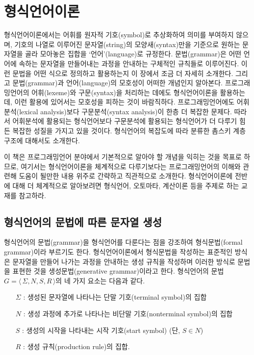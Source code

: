 \documentclass[b5paper,chapter,figtabcapt]{oblivoir}
\providecommand{\tightlist}{%
      \setlength{\itemsep}{0pt}\setlength{\parskip}{0pt}}
\begin{document}
\chapter{형식언어이론}

형식언어이론에서는 어휘를 원자적 기호(symbol)로 추상화하여 의미를 부여하지 않으며,
기호의 나열로 이루어진 문자열(string)의 모양새(syntax)만을 기준으로 원하는 문자열을
골라 모아놓은 집합을 `언어'(language)로 규정한다. 문법(grammar)은 어떤 언어에 속하는
문자열을 만들어내는 과정을 안내하는 구체적인 규칙들로 이루어진다. 이런 문법을
어떤 식으로 정의하고 활용하는지 이 장에서 조금 더 자세히 소개한다. 그리고
문법(grammar)과 언어(language)의 모호성이 어떠한 개념인지 알아본다.
프로그래밍언어의 어휘(lexeme)와 구문(syntax)을 처리하는 데에도 형식언어이론을
활용하는데, 이런 활용에 있어서는 모호성을 피하는 것이 바람직하다.
프로그래밍언어에도 어휘분석(lexical analysis)보다 구문분석(syntax analysis)이
한층 더 복잡한 문제다. 따라서 어휘분석에 활용되는 형식언어보다 구문분석에 
활용되는 형식언어가 더 다루기 힘든 복잡한 성질을 가지고 있을 것이다.
형식언어의 복잡도에 따라 분류한 촘스키 계층 구조에 대해서도 소개한다.

이 책은 프로그래밍언어 분야에서 기본적으로 알아야 할 개념을 익히는
것을 목표로 하므로, 여기서는 형식언어이론을 체계적으로 다루기보다는
프로그래밍언어의 이해와 관련해 도움이 될만한 내용 위주로 간략하고 직관적으로 소개한다. 
형식언어이론에 전반에 대해 더 체계적으로 알아보려면 형식언어, 오토마타, 계산이론
등을 주제로 하는 교재\cite{Sipser2013,Hopcroft2007}를 참고하라.

\section{형식언어의 문법에 따른 문자열 생성}
\label{sec:GenGrammar}
형식언어의 문법(grammar)을 형식언어를 다룬다는 점을 강조하여 형식문법(formal grammar)이라
부르기도 한다. 형식언어이론에서 형식문법을 작성하는 표준적인 방식은 문자열을
만들어 나가는 과정을 안내하는 생성 규칙을 작성하며 이러한 방식로 문법을
표현한 것을 생성문법(generative grammar)이라고 한다. 형식언어의 문법
$G = \langle\, \Sigma, N, S, R \,\rangle$의 네 가지 요소는 다음과 같다.\vspace{-1ex}
\begin{itemize}\tightlist
    \item[$\Sigma$]: 생성된 문자열에 나타나는 단말 기호(terminal symbol)의 집합
    \item[$N$]: 생성 과정에 추가로 나타나는 비단말 기호(nonterminal symbol)의 집합
    \item[$S$]: 생성의 시작을 나타내는 시작 기호(start symbol) (단, $S\in N$)
    \item[$R$]: 생성 규칙(production rule)의 집합.
\end{itemize}
\end{document}
